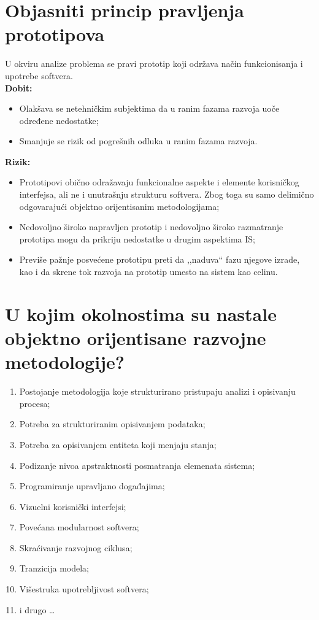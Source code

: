 \documentclass[a4paper]{article}
\begin{document}
\section{Objasniti princip pravljenja prototipova}
  U okviru analize problema se pravi prototip koji održava način funkcionisanja i upotrebe softvera.\\
  \textbf{Dobit:}
  \begin{itemize}
    \item Olakšava se netehničkim subjektima da u ranim fazama razvoja uoče određene nedostatke;
    \item Smanjuje se rizik od pogrešnih odluka u ranim fazama razvoja.
  \end{itemize}
  \textbf{Rizik:}
  \begin{itemize}
    \item Prototipovi obično odražavaju funkcionalne aspekte i elemente korisničkog interfejsa,   
          ali ne i unutrašnju strukturu softvera. Zbog toga su samo delimično 
          odgovarajući objektno orijentisanim metodologijama;
    \item Nedovoljno široko napravljen prototip i nedovoljno široko razmatranje prototipa mogu da 
          prikriju nedostatke u drugim aspektima IS;
    \item Previše pažnje posvećene prototipu preti da ,,naduva`` fazu njegove izrade, kao i da skrene
          tok razvoja na prototip umesto na sistem kao celinu.                    
  \end{itemize}

\section{U kojim okolnostima su nastale objektno orijentisane razvojne metodologije?}
  \begin{enumerate}
    \item Postojanje metodologija koje strukturirano pristupaju analizi i opisivanju procesa;
    \item Potreba za strukturiranim opisivanjem podataka;
    \item Potreba za opisivanjem entiteta koji menjaju stanja;
    \item Podizanje nivoa apstraktnosti posmatranja elemenata sistema;
    \item Programiranje upravljano događajima;
    \item Vizuelni korisnički interfejsi;
    \item Povećana modularnost softvera;
    \item Skraćivanje razvojnog ciklusa;
    \item Tranzicija modela;
    \item Višestruka upotrebljivost softvera;
    \item i drugo \dots
  \end{enumerate}
\end{document}
